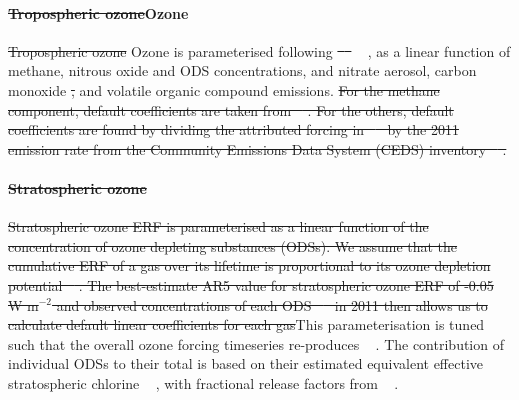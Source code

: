 \documentclass[gmd, manuscript]{copernicus}
\providecommand{\DIFadd}[1]{{\protect\color{blue}#1}} %
\providecommand{\DIFdel}[1]{{\protect\color{red}\sout{#1}}}                      %
\providecommand{\DIFaddbegin}{} %
\providecommand{\DIFaddend}{} %
\providecommand{\DIFdelbegin}{} %
\providecommand{\DIFdelend}{} %
\begin{document}
\DIFaddend \paragraph*{\DIFdelbegin \DIFdel{Tropospheric ozone}\DIFdelend \DIFaddbegin \DIFadd{Ozone}\DIFaddend }
\DIFdelbegin \DIFdel{Tropospheric ozone }\DIFdelend \DIFaddbegin \DIFadd{Ozone }\DIFaddend is parameterised following \DIFdelbegin \DIFdel{\mbox{%
\citep{Stevenson2013} }\hspace{0pt}%
}\DIFdelend \DIFaddbegin \DIFadd{\mbox{%
\cite{Thornhill2021}}\hspace{0pt}%
, }\DIFaddend as a linear function of methane\DIFaddbegin \DIFadd{, nitrous oxide and ODS }\DIFaddend concentrations, and nitrate aerosol, carbon monoxide \DIFdelbegin \DIFdel{, }\DIFdelend and volatile organic compound emissions. \DIFdelbegin \DIFdel{For the methane component, default coefficients are taken from \mbox{%
\cite{Holmes2013}}\hspace{0pt}%
. For the others, default coefficients are found by dividing the attributed forcing in \mbox{%
\citep{Myhre2013a} }\hspace{0pt}%
by the 2011 emission rate from the Community Emissions Data System (CEDS) inventory \mbox{%
\citep{Hoesly2018}}\hspace{0pt}%
.
}\paragraph*{\DIFdel{Stratospheric ozone}}
\DIFdel{Stratospheric ozone ERF is parameterised as a linear function of the concentration of ozone depleting substances (ODSs). We assume that the cumulative ERF of a gas over its lifetime is proportional to its ozone depletion potential \mbox{%
\citep{WMOAppA}}\hspace{0pt}%
. The best-estimate AR5 value for stratospheric ozone ERF of -0.05 W m$^{-2}$ and observed concentrations of each ODS \mbox{%
\citep{Meinshausen2017} }\hspace{0pt}%
in 2011 then allows us to calculate default linear coefficients for each gas}\DIFdelend \DIFaddbegin \DIFadd{This parameterisation is tuned such that the overall ozone forcing timeseries re-produces \mbox{%
\cite{Skeie2020}}\hspace{0pt}%
. The contribution of individual ODSs to their total is based on their estimated equivalent effective stratospheric chlorine \mbox{%
\citep{Newman2007,Velders2014,Smith2018}}\hspace{0pt}%
, with fractional release factors from \mbox{%
\cite{Engel2018}}\hspace{0pt}%
}\DIFaddend .
\end{document}
